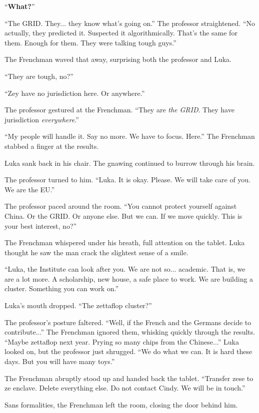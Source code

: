 \documentclass[ebook,11pt,oneside,openany]{memoir}
\begin{document}
``\textbf{What?}''

``The GRID. They... they know what's going on.'' The professor straightened. ``No actually, they predicted it. Suspected it algorithmically. That's the same for them. Enough for them. They were talking tough guys.''

The Frenchman waved that away, surprising both the professor and Luka.

``They are tough, no?''

``Zey have no jurisdiction here. Or anywhere.''

The professor gestured at the Frenchman. ``They are \textit{the GRID}. They have jurisdiction \textit{everywhere}.''

``My people will handle it. Say no more. We have to focus. Here.'' The Frenchman stabbed a finger at the results.

Luka sank back in his chair. The gnawing continued to burrow through his brain.

The professor turned to him. ``Luka. It is okay. Please. We will take care of you. We are the EU.''

The professor paced around the room. ``You cannot protect yourself against China. Or the GRID. Or anyone else. But we can. If we move quickly. This is your best interest, no?''

The Frenchman whispered under his breath, full attention on the tablet. Luka thought he saw the man crack the slightest sense of a smile.

``Luka, the Institute can look after you. We are not so... academic. That is, we are a lot more. A scholarship, new house, a safe place to work. We are building a cluster. Something you can work on.''

Luka's mouth dropped. ``The zettaflop cluster?''

The professor's posture faltered. ``Well, if the French and the Germans decide to contribute...'' The Frenchman ignored them, whisking quickly through the results. ``Maybe zettaflop next year. Prying so many chips from the Chinese...'' Luka looked on, but the professor just shrugged. ``We do what we can. It is hard these days. But you will have many toys.''

The Frenchman abruptly stood up and handed back the tablet. ``Transfer zese to ze enclave. Delete everything else. Do not contact Cindy. We will be in touch.''

Sans formalities, the Frenchman left the room, closing the door behind him.
\end{document}
